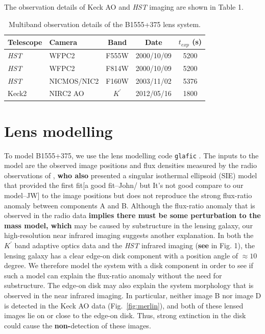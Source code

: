 \documentclass[useAMS,usenatbib]{mn2e}
\begin{document}
The observation details of Keck AO and \textit{HST} imaging are shown in Table 1.

\begin{table}
 \centering
  \caption{Multiband observation details of the B1555+375 lens system.}
  \begin{tabular}{@{}llccc}
  
\hline
  Telescope     &      Camera     &  Band & Date &$t_{exp}$ (s) \\

 \hline
   \textit{HST}				&		WFPC2    &  F555W		&	2000/10/09 	&	5200\\
   \textit{HST}				&		WFPC2    &  F814W		&	2000/10/09 &	5200\\
   \textit{HST}				&		NICMOS/NIC2	&	F160W	&	2003/11/02 & 5376\\
   Keck2			&		NIRC2 AO	&   $K^\prime$	& 2012/05/16	&  1800\\
   \hline
\end{tabular}
\end{table}


\section{Lens modelling}

To model B1555+375, we use the lens modelling code {\tt glafic}
\citep{Oguri}.  The inputs to the model are the observed image
positions and flux densities measured by the radio observations of
\citet{Marlow99}, \textbf{who also} presented a singular isothermal ellipsoid
(SIE) model that provided the first fit[a good fit--John/ but It's not good compare to our model--JW] to the image positions but
does not reproduce the strong flux-ratio anomaly between components A
and B.  %
Although the flux-ratio anomaly that is observed in the radio data \textbf{implies there must be some perturbation to the mass model, which} may be
caused by substructure in the lensing galaxy, our high-resolution near
infrared imaging suggests another explanation.  In both the $K^\prime$
band adaptive optics data and the \textit{HST} infrared imaging (\textbf{see} in
Fig. 1), the lensing galaxy has a clear edge-on disk component with a
position angle of $\approx 10$ degree.  We therefore model the system
with a disk component in order to see if such a model can explain the
flux-ratio anomaly without the need for substructure.  The edge-on
disk may also explain the system morphology that is observed in the
near infrared imaging.  In particular, neither image B nor image D is
detected in the Keck AO data (Fig.~\ref{fig:merlin}), and both of
these lensed images lie on or close to the edge-on disk.  Thus, strong
extinction in the disk could cause the \textbf{non-}detection of these
images.
\end{document}

